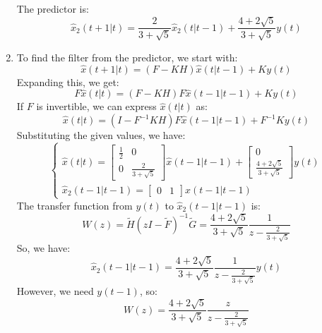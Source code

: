 \begin{enumerate}
        The predictor is:
        \[\hat{x}_2(t+1|t)=\dfrac{2}{3+\sqrt{5}}\hat{x}_2(t|t-1)+\dfrac{4+2\sqrt{5}}{3+\sqrt{5}}y(t)\]
    \item To find the filter from the predictor, we start with:
        \[\hat{x}(t+1|t)=(F-KH)\hat{x}(t|t-1)+Ky(t)\]
        Expanding this, we get:
        \[F\hat{x}(t|t)=(F-KH)F\hat{x}(t-1|t-1)+Ky(t)\]
        If $F$ is invertible, we can express $\hat{x}(t|t)$ as:
        \[\hat{x}(t|t)=(I-F^{-1}KH)F\hat{x}(t-1|t-1)+F^{-1}Ky(t)\]
        Substituting the given values, we have:
        \[\begin{cases}
            \hat{x}(t|t)=\begin{bmatrix}
                \frac{1}{2} & 0 \\ 0 & \frac{2}{3+\sqrt{5}}\end{bmatrix}\hat{x}(t-1|t-1)+\begin{bmatrix} 0 \\ \frac{4+2\sqrt{5}}{3+\sqrt{5}} \end{bmatrix} y(t) \\
                \hat{x}_2(t-1|t-1)=\begin{bmatrix} 0 & 1 \end{bmatrix}\hat{x}(t-1|t-1)
        \end{cases}\] 
        The transfer function from $y(t)$ to $\hat{x}_2(t-1|t-1)$ is: 
        \[W(z)=\tilde{H}(zI-\tilde{F})^{-1}\tilde{G}=\dfrac{4+2\sqrt{5}}{3+\sqrt{5}}\dfrac{1}{z-\frac{2}{3+\sqrt{5}}}\]
        So, we have:
        \[\hat{x}_2(t-1|t-1)=\dfrac{4+2\sqrt{5}}{3+\sqrt{5}}\dfrac{1}{z-\frac{2}{3+\sqrt{5}}}y(t)\]
        However, we need $y(t-1)$, so:
        \[W(z)=\dfrac{4+2\sqrt{5}}{3+\sqrt{5}}\dfrac{z}{z-\frac{2}{3+\sqrt{5}}}\]
\end{enumerate}